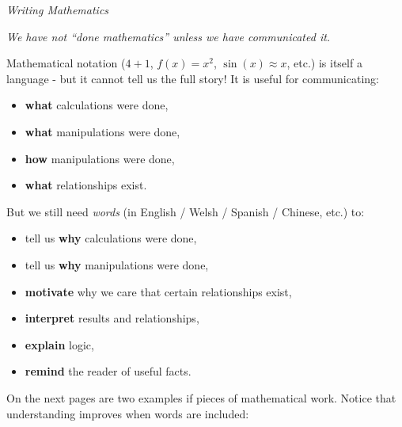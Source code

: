 \documentclass[12pt]{article}
\begin{document}
\begin{center}
\LARGE{\textit{Writing Mathematics}}
\end{center}


\begin{center}\textit{We have not ``done mathematics'' unless we have communicated it.}\end{center}

\vspace{5mm}

\begin{mdframed}[linewidth=0.5mm, backgroundcolor=cyan!10]
Mathematical notation ($4+1$, $f(x) = x^2$, $\sin(x) \approx x$, etc.) is itself a language - but it cannot tell us the full story! It is useful for communicating:
\begin{itemize}
  \item \textbf{what} calculations were done,
  \item \textbf{what} manipulations were done,
  \item \textbf{how} manipulations were done,
  \item \textbf{what} relationships exist.
\end{itemize}
\end{mdframed}

\vspace{5mm}

\begin{mdframed}[linewidth=0.5mm, backgroundcolor=orange!10]
But we still need \textit{words} (in English / Welsh / Spanish / Chinese, etc.) to:
\begin{itemize}
  \item tell us \textbf{why} calculations were done,
  \item tell us \textbf{why} manipulations were done,
  \item \textbf{motivate} why we care that certain relationships exist,
  \item \textbf{interpret} results and relationships,
  \item \textbf{explain} logic,
  \item \textbf{remind} the reader of useful facts.
\end{itemize}
\end{mdframed}

\vspace{5mm}

On the next pages are two examples if pieces of mathematical work. Notice that understanding improves when words are included:
\end{document}
